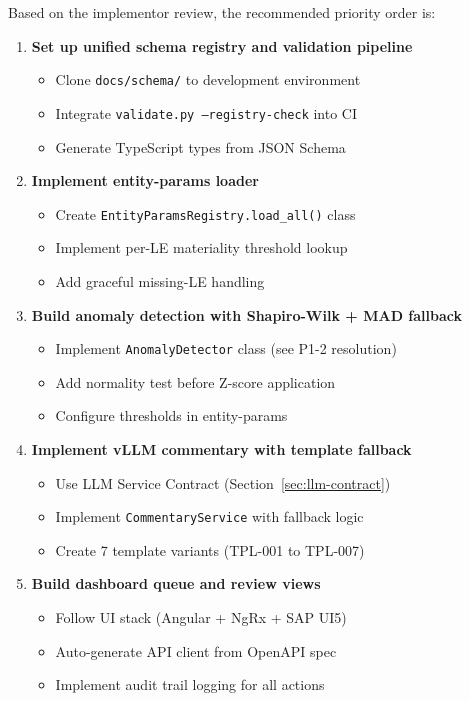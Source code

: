 Based on the implementor review, the recommended priority order is:

\begin{enumerate}
    \item \textbf{Set up unified schema registry and validation pipeline}
    \begin{itemize}
        \item Clone \texttt{docs/schema/} to development environment
        \item Integrate \texttt{validate.py --registry-check} into CI
        \item Generate TypeScript types from JSON Schema
    \end{itemize}
    
    \item \textbf{Implement entity-params loader}
    \begin{itemize}
        \item Create \texttt{EntityParamsRegistry.load\_all()} class
        \item Implement per-LE materiality threshold lookup
        \item Add graceful missing-LE handling
    \end{itemize}
    
    \item \textbf{Build anomaly detection with Shapiro-Wilk + MAD fallback}
    \begin{itemize}
        \item Implement \texttt{AnomalyDetector} class (see P1-2 resolution)
        \item Add normality test before Z-score application
        \item Configure thresholds in entity-params
    \end{itemize}
    
    \item \textbf{Implement vLLM commentary with template fallback}
    \begin{itemize}
        \item Use LLM Service Contract (Section~\ref{sec:llm-contract})
        \item Implement \texttt{CommentaryService} with fallback logic
        \item Create 7 template variants (TPL-001 to TPL-007)
    \end{itemize}
    
    \item \textbf{Build dashboard queue and review views}
    \begin{itemize}
        \item Follow UI stack (Angular + NgRx + SAP UI5)
        \item Auto-generate API client from OpenAPI spec
        \item Implement audit trail logging for all actions
    \end{itemize}
\end{enumerate}

